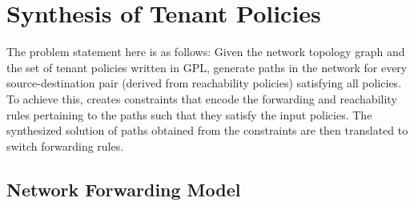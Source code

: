 \section{Synthesis of Tenant Policies} \label{sec:synthesisalgo}

The problem statement here is as follows: Given the network topology
graph and the set of tenant policies written in GPL, generate paths in
the network for every source-destination pair 
(derived from reachability policies)
satisfying all policies.  To achieve this, \Name
creates constraints that encode the forwarding and reachability rules
pertaining to the paths such that they satisfy the input policies.
The synthesized solution of paths obtained from the constraints are
then translated to switch forwarding rules.  


\subsection{Network Forwarding Model} \label{sec:fwdmodel}

